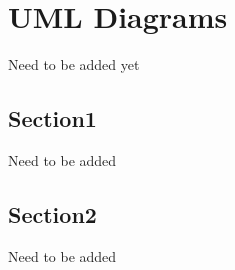 \chapter{UML Diagrams}
Need to be added yet
\section{Section1}
Need to be added
\section{Section2}
Need to be added
